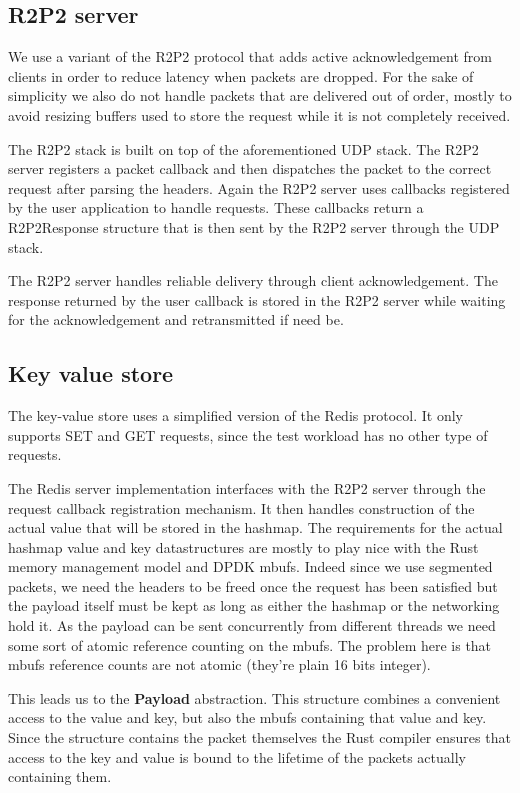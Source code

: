 \documentclass[11pt]{article}
\begin{document}
\subsection{R2P2 server}

We use a variant of the R2P2 protocol that adds active acknowledgement
from clients in order to reduce latency when packets are dropped. For
the sake of simplicity we also do not handle packets that are
delivered out of order, mostly to avoid resizing buffers used to store
the request while it is not completely received.

The R2P2 stack is built on top of the aforementioned UDP stack. The
R2P2 server registers a packet callback and then dispatches the packet
to the correct request after parsing the headers. Again the R2P2
server uses callbacks registered by the user application to handle
requests. These callbacks return a R2P2Response structure that is then
sent by the R2P2 server through the UDP stack.

The R2P2 server handles reliable delivery through client
acknowledgement. The response returned by the user callback is stored
in the R2P2 server while waiting for the acknowledgement and
retransmitted if need be.

\subsection{Key value store}

The key-value store uses a simplified version of the Redis
protocol. It only supports SET and GET requests, since the test
workload has no other type of requests.

The Redis server implementation interfaces with the R2P2 server through
the request callback registration mechanism. It then handles
construction of the actual value that will be stored in the
hashmap. The requirements for the actual hashmap value and key
datastructures are mostly to play nice with the Rust memory management
model and DPDK mbufs. Indeed since we use segmented packets, we need
the headers to be freed once the request has been satisfied but the
payload itself must be kept as long as either the hashmap or the
networking hold it. As the payload can be sent concurrently from
different threads we need some sort of atomic reference counting on
the mbufs. The problem here is that mbufs reference counts are not
atomic (they're plain 16 bits integer).

This leads us to the \textbf{Payload} abstraction. This structure combines a
convenient access to the value and key, but also the mbufs containing
that value and key. Since the structure contains the packet
themselves the Rust compiler ensures that access to the key and value
is bound to the lifetime of the packets actually containing them.
\end{document}
